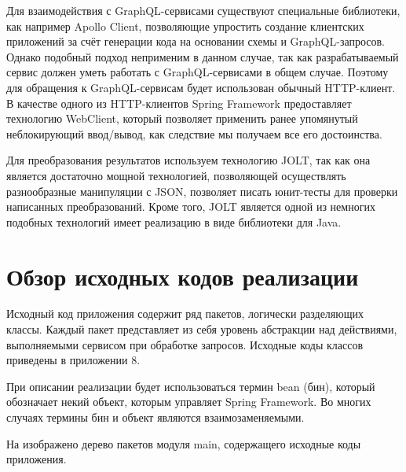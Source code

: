 Для взаимодействия с GraphQL-сервисами существуют специальные библиотеки, как например Apollo Client, позволяющие упростить создание клиентских приложений за счёт генерации кода на основании схемы и GraphQL-запросов.
Однако подобный подход неприменим в данном случае, так как разрабатываемый сервис должен уметь работать с GraphQL-сервисами в общем случае.
Поэтому для обращения к GraphQL-сервисам будет использован обычный HTTP-клиент.
В качестве одного из HTTP-клиентов Spring Framework предоставляет технологию WebClient, который позволяет применить ранее упомянутый неблокирующий ввод/вывод, как следствие мы получаем все его достоинства.

Для преобразования результатов используем технологию JOLT, так как она является достаточно мощной технологией, позволяющей осуществлять разнообразные манипуляции с JSON, позволяет писать юнит-тесты для проверки написанных преобразований.
Кроме того, JOLT является одной из немногих подобных технологий имеет реализацию в виде библиотеки для Java.


\section{Обзор исходных кодов реализации}\label{sec:sources-review}

Исходный код приложения содержит ряд пакетов, логически разделяющих классы.
Каждый пакет представляет из себя уровень абстракции над действиями, выполняемыми сервисом при обработке запросов.
Исходные коды классов приведены в приложении 8.

При описании реализации будет использоваться термин bean (бин), который обозначает некий объект, которым управляет Spring Framework.
Во многих случаях термины бин и объект являются взаимозаменяемыми.

На  изображено дерево пакетов модуля main, содержащего исходные коды приложения.

